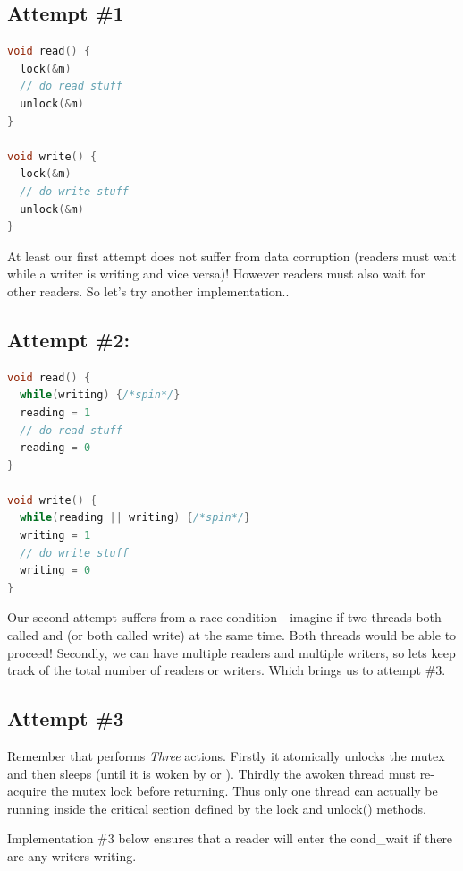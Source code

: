 \subsection{Attempt \#1}\label{attempt-1}

\begin{lstlisting}[language=C]
void read() {
  lock(&m)
  // do read stuff
  unlock(&m)
}

void write() {
  lock(&m)
  // do write stuff
  unlock(&m)
}
\end{lstlisting}

At least our first attempt does not suffer from data corruption (readers must wait while a writer is writing and vice versa)! However readers must also wait for other readers. So let's try another implementation..

\subsection{Attempt \#2:}\label{attempt-2}

\begin{lstlisting}[language=C]
void read() {
  while(writing) {/*spin*/}
  reading = 1
  // do read stuff
  reading = 0
}

void write() {
  while(reading || writing) {/*spin*/}
  writing = 1
  // do write stuff
  writing = 0
}
\end{lstlisting}

Our second attempt suffers from a race condition - imagine if two threads both called  and  (or both called write) at the same time. Both threads would be able to proceed! Secondly, we can have multiple readers and multiple writers, so lets keep track of the total number of readers or writers. Which brings us to attempt \#3.

\subsection{Attempt \#3}\label{attempt-3}

Remember that  performs \emph{Three} actions. Firstly it atomically unlocks the mutex and then sleeps (until it is woken by  or ). Thirdly the awoken thread must re-acquire the mutex lock before returning. Thus only one thread can actually be running inside the critical section defined by the lock and unlock() methods.

Implementation \#3 below ensures that a reader will enter the cond\_wait if there are any writers writing.


